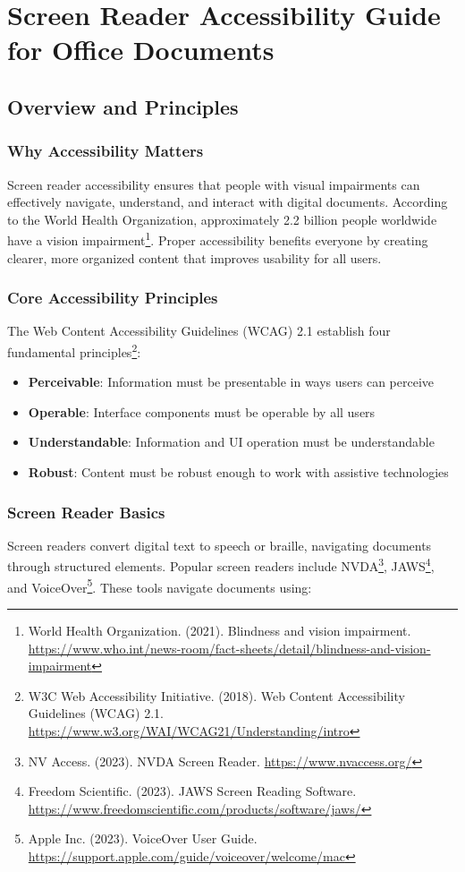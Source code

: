 \chapter{Screen Reader Accessibility Guide for Office Documents}

\section{Overview and Principles}

\subsection{Why Accessibility Matters}
Screen reader accessibility ensures that people with visual impairments can effectively navigate, understand, and interact with digital documents. According to the World Health Organization, approximately 2.2 billion people worldwide have a vision impairment\footnote{World Health Organization. (2021). Blindness and vision impairment. \url{https://www.who.int/news-room/fact-sheets/detail/blindness-and-vision-impairment}}. Proper accessibility benefits everyone by creating clearer, more organized content that improves usability for all users.

\subsection{Core Accessibility Principles}
The Web Content Accessibility Guidelines (WCAG) 2.1 establish four fundamental principles\footnote{W3C Web Accessibility Initiative. (2018). Web Content Accessibility Guidelines (WCAG) 2.1. \url{https://www.w3.org/WAI/WCAG21/Understanding/intro}}:

\begin{itemize}
\item \textbf{Perceivable}: Information must be presentable in ways users can perceive
\item \textbf{Operable}: Interface components must be operable by all users
\item \textbf{Understandable}: Information and UI operation must be understandable
\item \textbf{Robust}: Content must be robust enough to work with assistive technologies
\end{itemize}

\subsection{Screen Reader Basics}
Screen readers convert digital text to speech or braille, navigating documents through structured elements. Popular screen readers include NVDA\footnote{NV Access. (2023). NVDA Screen Reader. \url{https://www.nvaccess.org/}}, JAWS\footnote{Freedom Scientific. (2023). JAWS Screen Reading Software. \url{https://www.freedomscientific.com/products/software/jaws/}}, and VoiceOver\footnote{Apple Inc. (2023). VoiceOver User Guide. \url{https://support.apple.com/guide/voiceover/welcome/mac}}. These tools navigate documents using:


